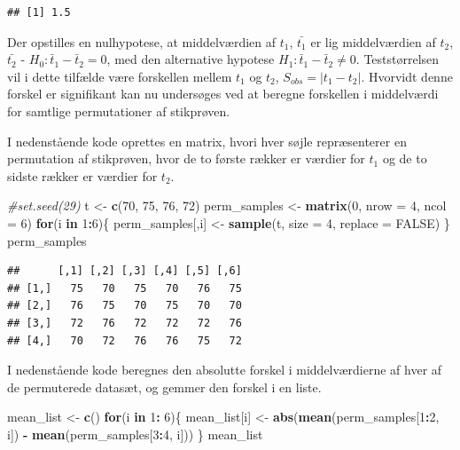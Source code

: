 \documentclass[
]{book}
\newenvironment{Shaded}{\begin{snugshade}}{\end{snugshade}}
\newcommand{\CommentTok}[1]{\textcolor[rgb]{0.56,0.35,0.01}{\textit{#1}}}
\newcommand{\ControlFlowTok}[1]{\textcolor[rgb]{0.13,0.29,0.53}{\textbf{#1}}}
\newcommand{\DataTypeTok}[1]{\textcolor[rgb]{0.13,0.29,0.53}{#1}}
\newcommand{\DecValTok}[1]{\textcolor[rgb]{0.00,0.00,0.81}{#1}}
\newcommand{\KeywordTok}[1]{\textcolor[rgb]{0.13,0.29,0.53}{\textbf{#1}}}
\newcommand{\NormalTok}[1]{#1}
\newcommand{\OperatorTok}[1]{\textcolor[rgb]{0.81,0.36,0.00}{\textbf{#1}}}
\newcommand{\OtherTok}[1]{\textcolor[rgb]{0.56,0.35,0.01}{#1}}
\newcommand{\StringTok}[1]{\textcolor[rgb]{0.31,0.60,0.02}{#1}}
\theoremstyle{definition}
\theoremstyle{definition}
\theoremstyle{definition}
\theoremstyle{remark}
\begin{document}
\begin{verbatim}
## [1] 1.5
\end{verbatim}

Der opstilles en nulhypotese, at middelværdien af \(t_1\), \(\bar{t_1}\) er lig middelværdien af \(t_2\), \(\bar{t_2}\) - \(H_0: \bar t_1 - \bar t_2 = 0\), med den alternative hypotese \(H_1: \bar t_1 - \bar t_2 \neq 0\). Teststørrelsen vil i dette tilfælde være forskellen mellem \(t_1\) og \(t_2\), \(S_{obs} = |t_1 - t_2|\). Hvorvidt denne forskel er signifikant kan nu undersøges ved at beregne forskellen i middelværdi for samtlige permutationer af stikprøven.

I nedenstående kode oprettes en matrix, hvori hver søjle repræsenterer en permutation af stikprøven, hvor de to første rækker er værdier for \(t_1\) og de to sidste rækker er værdier for \(t_2\).

\begin{Shaded}
\begin{Highlighting}[]
\CommentTok{#set.seed(29)}
\NormalTok{t <-}\StringTok{ }\KeywordTok{c}\NormalTok{(}\DecValTok{70}\NormalTok{, }\DecValTok{75}\NormalTok{, }\DecValTok{76}\NormalTok{, }\DecValTok{72}\NormalTok{)}
\NormalTok{perm_samples <-}\StringTok{ }\KeywordTok{matrix}\NormalTok{(}\DecValTok{0}\NormalTok{, }\DataTypeTok{nrow =} \DecValTok{4}\NormalTok{, }\DataTypeTok{ncol =} \DecValTok{6}\NormalTok{)}
\ControlFlowTok{for}\NormalTok{(i }\ControlFlowTok{in} \DecValTok{1}\OperatorTok{:}\DecValTok{6}\NormalTok{)\{}
\NormalTok{  perm_samples[,i] <-}\StringTok{ }\KeywordTok{sample}\NormalTok{(t, }\DataTypeTok{size =} \DecValTok{4}\NormalTok{, }\DataTypeTok{replace =} \OtherTok{FALSE}\NormalTok{)}
\NormalTok{\}}
\NormalTok{perm_samples}
\end{Highlighting}
\end{Shaded}

\begin{verbatim}
##      [,1] [,2] [,3] [,4] [,5] [,6]
## [1,]   75   70   75   70   76   75
## [2,]   76   75   70   75   70   70
## [3,]   72   76   72   72   72   76
## [4,]   70   72   76   76   75   72
\end{verbatim}

I nedenstående kode beregnes den absolutte forskel i middelværdierne af hver af de permuterede datasæt, og gemmer den forskel i en liste.

\begin{Shaded}
\begin{Highlighting}[]
\NormalTok{mean_list <-}\StringTok{ }\KeywordTok{c}\NormalTok{()}
\ControlFlowTok{for}\NormalTok{(i }\ControlFlowTok{in} \DecValTok{1}\OperatorTok{:}\StringTok{ }\DecValTok{6}\NormalTok{)\{}
\NormalTok{  mean_list[i] <-}\StringTok{ }\KeywordTok{abs}\NormalTok{(}\KeywordTok{mean}\NormalTok{(perm_samples[}\DecValTok{1}\OperatorTok{:}\DecValTok{2}\NormalTok{, i]) }\OperatorTok{-}\StringTok{ }\KeywordTok{mean}\NormalTok{(perm_samples[}\DecValTok{3}\OperatorTok{:}\DecValTok{4}\NormalTok{, i]))}
\NormalTok{\}}
\NormalTok{mean_list}
\end{Highlighting}
\end{Shaded}
\end{document}
